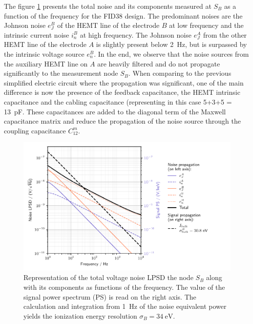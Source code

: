 The figure \ref{fig:planar38-propagation} presents the total noise and its components measured at $S_B$ as a function of the frequency for the FID38 design. The predominant noises are the Johnson noise $e_{J}^B$ of the HEMT line of the electrode $B$ at low frequency and the intrinsic current noise $i_n^B$ at high frequency. The Johnson noise $e_J^A$ from the other HEMT line of the electrode $A$ is slightly present below \SI{2}{\Hz}, but is surpassed by the intrinsic voltage source $e_n^B$. In the end, we observe that the noise sources from the auxiliary HEMT line on $A$ are heavily filtered and do not propagate significantly to the measurement node $S_B$. When comparing to the previous simplified electric circuit where the propagation was significant, one of the main difference is now the presence of the feedback capacitance, the HEMT intrinsic capacitance and the cabling capacitance (representing in this case 5+3+5 = \SI{13}{\pico\farad}. These capacitances are added to the diagonal term of the Maxwell capacitance matrix and reduce the propagation of the noise source through the coupling capacitance $C_{12}^m$.

\begin{figure}
\centering
\includegraphics[scale=1]{Figures/Electrodes/pl38_noise_propagation.pdf}
\caption{Representation of the total voltage noise LPSD the node $S_B$ along with its components as functions of the frequency. The value of the signal power spectrum (PS) is read on the right axis. The calculation and integration from \SI{1}{\Hz} of the noise equivalent power yields the ionization energy resolution $\sigma_{B} = \SI{34}{\eV}$.}
\label{fig:planar38-propagation}
\end{figure}

